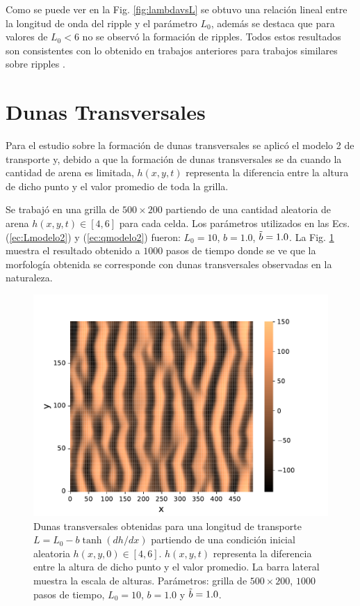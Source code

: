 \documentclass[11pt,twocolumn,twoside]{opticajnl}
\begin{document}
Como se puede ver en la Fig. \ref{fig:lambdavsL} se obtuvo una relación lineal entre la longitud de onda del ripple y el parámetro $L_0$, además se destaca que para valores de $L_0 < 6$ no se observó la formación de ripples. Todos estos resultados son consistentes con lo obtenido en trabajos anteriores para trabajos similares sobre ripples \cite{nishimori_formation_1993}.

\section{Dunas Transversales \label{sec:dunas_transversales}}

Para el estudio sobre la formación de dunas transversales se aplicó el modelo 2 de transporte y, debido a que la formación de dunas transversales se da cuando la cantidad de arena es limitada, $h(x,y,t)$ representa la diferencia entre la altura de dicho punto y el valor promedio de toda la grilla.

Se trabajó en una grilla de $500\times200$ partiendo de una cantidad aleatoria de arena $h(x,y,t) \in [4,6]$ para cada celda. Los parámetros utilizados en las Ecs. (\ref{ec:Lmodelo2}) y (\ref{ec:qmodelo2}) fueron: $L_0 =10$, $b=1.0$, $\Tilde{b} = 1.0$. La Fig. \ref{fig:dunas_transversales} muestra el resultado obtenido a $1000$ pasos de tiempo donde se ve que la morfología obtenida se corresponde con dunas transversales observadas en la naturaleza. 

\begin{figure}[H]
\centering
\includegraphics[width=\linewidth]{Figuras/dunas_transversales.pdf}
\caption{ \centering Dunas transversales obtenidas para una longitud de transporte $L = L_0 - b \tanh{  (dh/dx) }$ partiendo de una condición inicial aleatoria $h(x,y,0) \in [4,6]$. $h(x,y,t)$ representa la diferencia entre la altura de dicho punto y el valor promedio. La barra lateral muestra la escala de alturas. Parámetros: grilla de $500 \times 200$, $1000$ pasos de tiempo, $L_0 = 10$, $b=1.0$ y $\Tilde{b}=1.0$.}
\label{fig:dunas_transversales}
\end{figure}
\end{document}
